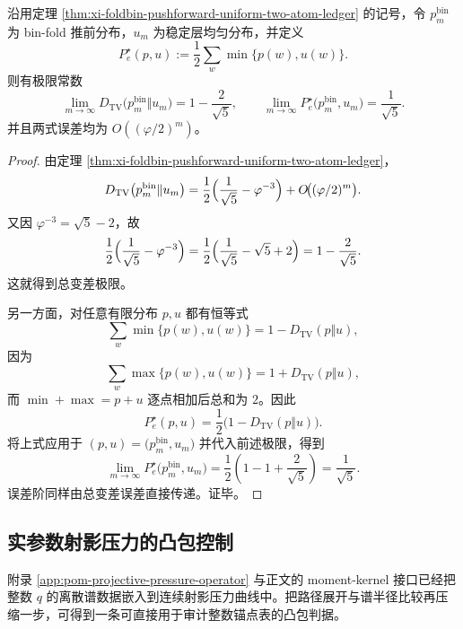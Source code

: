 \begin{corollary}\label{cor:derived-binfold-tv-bayes-constants}
沿用定理 \ref{thm:xi-foldbin-pushforward-uniform-two-atom-ledger} 的记号，令 \(p_m^{\mathrm{bin}}\) 为 bin-fold 推前分布，\(u_m\) 为稳定层均匀分布，并定义
\[
P_e^\star(p,u):=\frac12\sum_{w}\min\{p(w),u(w)\}.
\]
则有极限常数
\[
\boxed{\;
\lim_{m\to\infty}D_{\mathrm{TV}}\bigl(p_m^{\mathrm{bin}}\Vert u_m\bigr)
=
1-\frac{2}{\sqrt5},
\qquad
\lim_{m\to\infty}P_e^\star\bigl(p_m^{\mathrm{bin}},u_m\bigr)
=
\frac1{\sqrt5}.\;}
\]
并且两式误差均为 \(O((\varphi/2)^m)\)。
\end{corollary}
\begin{proof}
由定理 \ref{thm:xi-foldbin-pushforward-uniform-two-atom-ledger}，
\[
D_{\mathrm{TV}}\bigl(p_m^{\mathrm{bin}}\Vert u_m\bigr)
=
\frac12\Bigl(\frac1{\sqrt5}-\varphi^{-3}\Bigr)
+O\!\bigl((\varphi/2)^m\bigr).
\]
又因 \(\varphi^{-3}=\sqrt5-2\)，故
\[
\frac12\Bigl(\frac1{\sqrt5}-\varphi^{-3}\Bigr)
=
\frac12\Bigl(\frac1{\sqrt5}-\sqrt5+2\Bigr)
=
1-\frac{2}{\sqrt5}.
\]
这就得到总变差极限。

另一方面，对任意有限分布 \(p,u\) 都有恒等式
\[
\sum_w \min\{p(w),u(w)\}=1-D_{\mathrm{TV}}(p\Vert u),
\]
因为
\[
\sum_w \max\{p(w),u(w)\}=1+D_{\mathrm{TV}}(p\Vert u),
\]
而 \(\min+\max=p+u\) 逐点相加后总和为 \(2\)。因此
\[
P_e^\star(p,u)=\frac12\bigl(1-D_{\mathrm{TV}}(p\Vert u)\bigr).
\]
将上式应用于 \((p,u)=\bigl(p_m^{\mathrm{bin}},u_m\bigr)\) 并代入前述极限，得到
\[
\lim_{m\to\infty}P_e^\star\bigl(p_m^{\mathrm{bin}},u_m\bigr)
=
\frac12\left(1-1+\frac{2}{\sqrt5}\right)
=
\frac1{\sqrt5}.
\]
误差阶同样由总变差误差直接传递。证毕。
\end{proof}

\subsection{实参数射影压力的凸包控制}

附录 \ref{app:pom-projective-pressure-operator} 与正文的 moment-kernel 接口已经把整数 \(q\) 的离散谱数据嵌入到连续射影压力曲线中。把路径展开与谱半径比较再压缩一步，可得到一条可直接用于审计整数锚点表的凸包判据。

